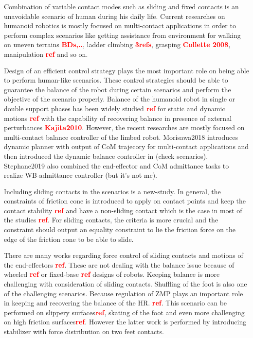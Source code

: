 \documentclass[letterpaper, 10pt, conference]{ieeeconf}
\begin{document}
Combination of variable contact modes such as sliding and fixed contacts is an unavoidable scenario of human during his daily life. 
Current researches on humanoid robotics is mostly focused on multi-contact applications in order to perform complex scenarios like getting assistance from environment for walking on uneven terrains \textcolor{red}{\textbf{BDs,..}}, ladder climbing \textcolor{red}{\textbf{3refs}}, grasping \textcolor{red}{\textbf{Collette 2008}}, manipulation \textcolor{red}{\textbf{ref}} and so on.


Design of an efficient control strategy plays the most important role on being able to perform human-like scenarios.
These control strategies should be able to guarantee the balance of the robot during certain scenarios and perform the objective of the scenario properly. Balance of the humanoid robot in single or double support phases has been widely studied \textcolor{red}{\textbf{ref}} for static and dynamic motions \textcolor{red}{\textbf{ref}} with the capability of recovering balance in presence of external perturbances \textcolor{red}{\textbf{Kajita2010}}. However, the recent researches are mostly focused on multi-contact balance controller of the limbed robot. Morisawa2018 introduces dynamic planner with output of CoM trajecory for multi-contact applications and then introduced the dynamic balance controller in (check scenarios). Stephane2019 also combined the end-effector and CoM admittance tasks to realize WB-admittance controller (but it's not mc). 

Including sliding contacts in the scenarios is a new-study. In general, the constraints of friction cone is introduced to apply on contact points and keep the contact stability \textcolor{red}{\textbf{ref}} and have a non-sliding contact which is the case in most of the studies \textcolor{red}{\textbf{ref}}. For sliding contacts, the criteria is more crucial and the constraint should output an equality constraint to lie the friction force on the edge of the friction cone to be able to slide. 

 There are many works regarding force control of sliding contacts and motions of the end-effectors \textcolor{red}{\textbf{ref}}. These are not dealing with the balance issue because of wheeled \textcolor{red}{\textbf{ref}} or fixed-base \textcolor{red}{\textbf{ref}} designs of robots.
 Keeping balance is more challenging with consideration of sliding contacts.
Shuffling of the foot is also one of the challenging scenarios. Because regulation of ZMP plays an important role in keeping and recovering the balance of the HR. \textcolor{red}{\textbf{ref}}. This scenario can be performed on slippery surfaces\textcolor{red}{\textbf{ref}}, skating of the foot and even more challenging on high friction surfaces\textcolor{red}{\textbf{ref}}. However the latter work is performed by introducing stabilizer with force distribution on two feet contacts.
\end{document}
